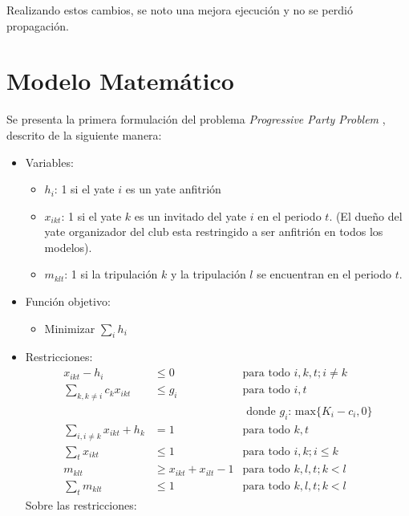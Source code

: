 \documentclass[letter, 10pt]{article}
\begin{document}
Realizando estos cambios, se noto una mejora ejecución y no se perdió propagación.





\section{Modelo Matemático}
Se presenta la primera formulación del problema \textit{Progressive Party Problem }, descrito de la siguiente manera:

\begin{itemize}
    \item Variables:
    \begin{itemize}
        \item $h_i$: 1 si el yate $i$ es un yate anfitrión
        \item $x_{ikt}$: 1 si el yate $k$ es un invitado del yate $i$ en el periodo $t$. (El dueño del yate organizador del club esta restringido a ser anfitrión en todos los modelos).
        \item $m_{klt}$: 1 si la tripulación $k$ y la tripulación $l$ se encuentran en el periodo $t$.
    \end{itemize}
    \item Función objetivo:
    \begin{itemize}
        \item Minimizar $\displaystyle \sum_{i} h_i$
    \end{itemize}
    \item Restricciones:
    \begin{align}
        \displaystyle x_{ikt} - h_i &\leq 0           & \text{para todo } i,k,t;i\neq k  \\ 
        \displaystyle \sum_{k,k\neq i} c_k x_{ikt} & \leq g_i & \text{para todo } i,t \\
        & & \text{ donde } g_i  \text{: max} \{K_i - c_i,0 \} \\
        \displaystyle \sum_{i,i\neq k} x_{ikt} + h_k &= 1            & \text{para todo }k,t \\
        \displaystyle \sum_{t} x_{ikt} &\leq 1            & \text{para todo } i,k;i \leq k \\
        \displaystyle m_{klt} &\geq x_{ikt} + x_{ilt} -1           & \text{para todo } k,l,t; k<l \\
        \displaystyle \sum_{t} m_{klt} &\leq 1 & \text{para todo } k,l,t; k<l
    \end{align}
    Sobre las restricciones:
    \begin{itemize}

\end{itemize}
\end{itemize}
\end{document}
